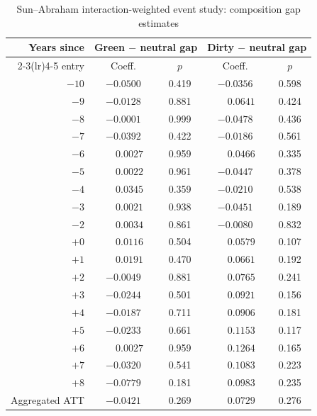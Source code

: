\documentclass{article}
\begin{document}
\begin{table}[htbp]
\centering
\footnotesize
\caption{Sun--Abraham interaction-weighted event study: composition gap estimates}
\label{tab:sunab}
\begin{threeparttable}
\begin{tabular}{rcccc}
\toprule
Years since & \multicolumn{2}{c}{Green $-$ neutral gap} & \multicolumn{2}{c}{Dirty $-$ neutral gap} \\
\cmidrule(lr){2-3}\cmidrule(lr){4-5}
entry & Coeff. & $p$ & Coeff. & $p$ \\
\midrule
$-10$ & $-0.0500$ & 0.419 & $-0.0356$ & 0.598 \\
$-9$  & $-0.0128$ & 0.881 & $\phantom{-}0.0641$  & 0.424 \\
$-8$  & $-0.0001$ & 0.999 & $-0.0478$ & 0.436 \\
$-7$  & $-0.0392$ & 0.422 & $-0.0186$ & 0.561 \\
$-6$  & $\phantom{-}0.0027$  & 0.959 & $\phantom{-}0.0466$  & 0.335 \\
$-5$  & $\phantom{-}0.0022$  & 0.961 & $-0.0447$ & 0.378 \\
$-4$  & $\phantom{-}0.0345$  & 0.359 & $-0.0210$ & 0.538 \\
$-3$  & $\phantom{-}0.0021$  & 0.938 & $-0.0451$ & 0.189 \\
$-2$  & $\phantom{-}0.0034$  & 0.861 & $-0.0080$ & 0.832 \\
$+0$  & $\phantom{-}0.0116$  & 0.504 & $\phantom{-}0.0579$  & 0.107 \\
$+1$  & $\phantom{-}0.0191$  & 0.470 & $\phantom{-}0.0661$  & 0.192 \\
$+2$  & $-0.0049$ & 0.881 & $\phantom{-}0.0765$  & 0.241 \\
$+3$  & $-0.0244$ & 0.501 & $\phantom{-}0.0921$  & 0.156 \\
$+4$  & $-0.0187$ & 0.711 & $\phantom{-}0.0906$  & 0.181 \\
$+5$  & $-0.0233$ & 0.661 & $\phantom{-}0.1153$  & 0.117 \\
$+6$  & $\phantom{-}0.0027$  & 0.959 & $\phantom{-}0.1264$  & 0.165 \\
$+7$  & $-0.0320$ & 0.541 & $\phantom{-}0.1083$  & 0.223 \\
$+8$  & $-0.0779$ & 0.181 & $\phantom{-}0.0983$  & 0.235 \\
\midrule
Aggregated ATT & $-0.0421$ & 0.269 & $\phantom{-}0.0729$ & 0.276 \\
\bottomrule
\end{tabular}
\begin{tablenotes}[flushleft]\footnotesize

\end{tablenotes}
\end{threeparttable}
\end{table}
\end{document}
